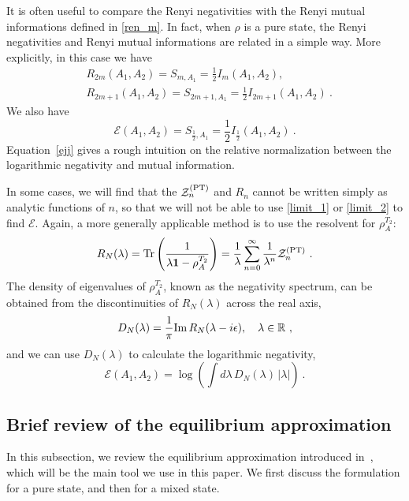 \documentclass[a4paper,11pt]{article}
\newcommand\half{{\ensuremath{\frac{1}{2}}}}
\newcommand\field[1]{{\ensuremath{\mathbb{{#1}}}}}
\newcommand{\RR}{\field{R}}
\newcommand{\be}{\begin{equation}}
\newcommand{\ee}{\end{equation}}
\newcommand\lam{\lambda}
\newcommand\ha{{\half}}
\newcommand\sE{{\ensuremath{{\mathcal E}}}}
\newcommand\sZ{{\mathcal Z}}
\begin{document}
It is often useful to compare the Renyi negativities with the Renyi mutual informations defined in \eqref{ren_m}. 
In fact, when $\rho$ is a pure state, the Renyi negativities and Renyi mutual informations are related in a simple way. More explicitly, in this case we have 
\begin{align} 
& R_{2m}(A_1, A_2) = S_{m, A_1} = \ha I_{m}(A_1, A_2) , \\
& R_{2m+1}(A_1, A_2) = S_{2m+1, A_1} =\ha I_{2m+1}(A_1, A_2) \ . \label{rjj}
\end{align} 
We also have 
\be \label{ejj}
\sE(A_1, A_2) = %
S_{\ha, A_1} = \ha I_{\ha}(A_1, A_2) \ .
\ee
Equation~\eqref{ejj} gives a rough intuition on the {relative normalization} between the logarithmic negativity and mutual information. 

In some cases, we will find that the $\sZ_n^{\rm (PT)}$ and $R_n$ cannot be written simply as analytic functions of $n$, so that we will not be able to use \eqref{limit_1} or \eqref{limit_2} to find $\sE$. Again, a more generally applicable method is to use the resolvent for $\rho_A^{T_2}$: 
\be 
R_N(\lambda) =\text{Tr}\left(\frac{1}{\lambda \mathbf{1} -\rho_A^{T_2}}\right) = \frac{1}{\lambda}\sum_{n=0}^{\infty} \frac{1}{\lambda^{n}} \sZ_n^{\rm (PT)} \ . 
\label{Rndef}
\ee 
The density of eigenvalues of $\rho_A^{T_2}$, known as the negativity spectrum, can be obtained from the discontinuities of $R_N(\lam)$ across the real axis, 
\be
D_N (\lam) = \frac{1}{\pi } {\rm Im} \, R_N(\lambda- i\epsilon), \quad \lam \in \RR \ , \label{Dndef}
\ee
and we can use $D_N(\lam)$ to calculate the logarithmic negativity, 
\be 
\sE(A_1, A_2) = \log\left(\int d \lam \, D_N(\lam) \, |\lambda|\right) \ .
\label{erdef}
\ee




\subsection{Brief review of the equilibrium approximation} \label{sec:revea}

In this subsection, we review the equilibrium approximation introduced in~\cite{2020arXiv200801089L}, which will be the main tool we use in this paper. We first discuss the formulation for a pure state, and then for a mixed state. 
\end{document}
